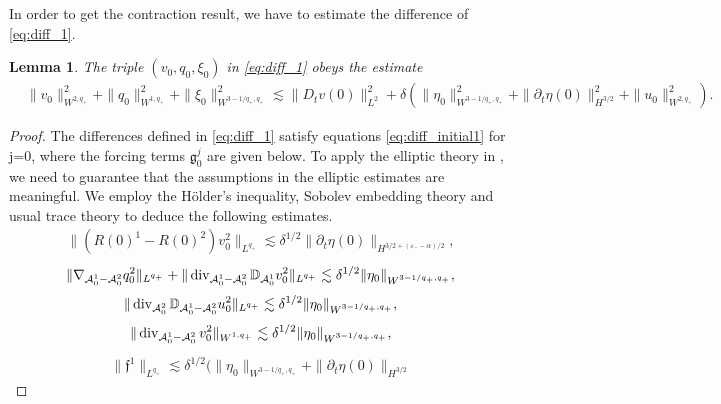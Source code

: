 \documentclass[letterpaper,reqno,10pt,twoside]{amsart}
\newtheorem{lemma}[theorem]{Lemma}
\theoremstyle{definition}
\theoremstyle{remark}
\def\p{\partial}
\def\dive{\mathop{\rm div}\nolimits}
\begin{document}
\begin{appendix}
			In order to get the contraction result, we have to estimate the difference of \eqref{eq:diff_1}.
			\begin{lemma}\label{lem:contract_2}
				The triple $(v_0, q_0, \xi_0)$ in \eqref{eq:diff_1} obeys the estimate
				\[
				\begin{aligned}
					&\|v_0\|_{W^{2,q_+}}^2+\|q_0\|_{W^{1,q_+}}^2+\|\xi_0\|_{W^{3-1/q_+,q_+}}^2\lesssim \|D_tv(0)\|_{L^2}^2+\delta(\|\eta_0\|_{W^{3-1/q_+,q_+}}^2+\|\p_t\eta(0)\|_{H^{3/2}}^2+\|u_0\|_{W^{2,q_+}}^2).
				\end{aligned}
				\]
			\end{lemma}
			\begin{proof}
				The differences defined in \eqref{eq:diff_1} satisfy equations \eqref{eq:diff_initial1} for j=0, where the forcing terms $\mathfrak{g}_{0}^{j}$ are given below. To apply the elliptic theory in \cite[Theorem 4.9]{GT2020}, we need to guarantee that the assumptions in the elliptic estimates are meaningful. We employ the H\"older's inequality, Sobolev embedding theory and usual trace theory to deduce the following estimates.
				\begin{equation}\label{est:diff_u1}
					\begin{aligned}
						\|(R(0)^1-R(0)^2)v_0^2\|_{L^{q_+}}\lesssim \delta^{1/2}\|\p_t\eta(0)\|_{H^{3/2+(\varepsilon_--\alpha)/2}},
					\end{aligned}
				\end{equation}
				\begin{equation}
					\begin{aligned}
						\|\nabla_{\mathcal{A}_0^1-\mathcal{A}_0^2}q_0^2\|_{L^{q_+}}+\|\dive_{\mathcal{A}_0^1-\mathcal{A}_0^2}\mathbb{D}_{\mathcal{A}_0^1}v_0^2\|_{L^{q_+}}\lesssim \delta^{1/2}\|\eta_0\|_{W^{3-1/q_+,q_+}},
					\end{aligned}
				\end{equation}
				\begin{equation}
					\|\dive_{\mathcal{A}_0^2}\mathbb{D}_{\mathcal{A}_0^1-\mathcal{A}_0^2}u_0^2\|_{L^{q_+}}\lesssim \delta^{1/2}\|\eta_0\|_{W^{3-1/q_+,q_+}},
				\end{equation}
				\begin{equation}
					\|\dive_{\mathcal{A}_0^1-\mathcal{A}_0^2}v_0^2\|_{W^{1,q_+}}\lesssim \delta^{1/2}\|\eta_0\|_{W^{3-1/q_+,q_+}},
				\end{equation}
				\begin{equation}
					\begin{aligned}
						\|\mathfrak{f}^1\|_{L^{q_+}}\lesssim \delta^{1/2} (\|\eta_0\|_{W^{3-1/q_+,q_+}}+\|\p_t\eta(0)\|_{H^{3/2}}

\end{aligned}
\end{equation}
\end{proof}
\end{appendix}
\end{document}
